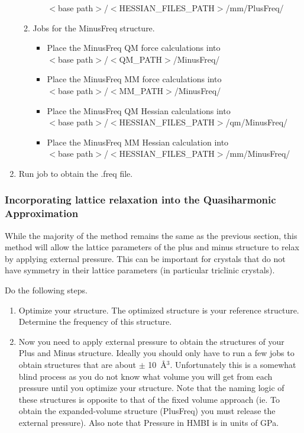 \documentclass[11pt,letterpaper]{article}
\begin{document}
\begin{spacing}{1.0}
\begin{enumerate}
\begin{enumerate}
\begin{itemize}
            $<$base path$>$/$<$HESSIAN\_FILES\_PATH$>$/mm/PlusFreq/  
        \end{itemize}
      \item Jobs for the MinusFreq structure.
        \begin{itemize}
          \item Place the MinusFreq QM force calculations into \\
            $<$base path$>$/$<$QM\_PATH$>$/MinusFreq/ 
          \item Place the MinusFreq MM force calculations into \\
            $<$base path$>$/$<$MM\_PATH$>$/MinusFreq/   
          \item Place the MinusFreq QM Hessian calculations into \\
            $<$base path$>$/$<$HESSIAN\_FILES\_PATH$>$/qm/MinusFreq/  
          \item Place the MinusFreq MM Hessian calculation into \\
            $<$base path$>$/$<$HESSIAN\_FILES\_PATH$>$/mm/MinusFreq/  
        \end{itemize}
      \end{enumerate}
    \item Run job to obtain the .freq file.

\end{enumerate}

\subsubsection{Incorporating lattice relaxation into the Quasiharmonic Approximation}
\label{Sec-Grun-freq-latt-relax}
While the majority of the method remains the same as the previous section, this method will allow the lattice parameters of the plus and minus structure to relax by applying external pressure. This can be important for crystals that do not have symmetry in their lattice parameters (in particular triclinic crystals).

Do the following steps.

\begin{enumerate}

  \item Optimize your structure. The optimized structure is your reference structure. Determine the frequency of this structure.
  \item Now you need to apply external pressure to obtain the structures of your Plus and Minus structure. Ideally you should only have to run a few jobs to obtain structures that are about $\pm$ 10~\AA$^3$. Unfortunately this is a somewhat blind process as you do not know what volume you will get from each pressure until you optimize your structure. Note that the naming logic of these structures is opposite to that of the fixed volume approach (ie. To obtain the expanded-volume structure (PlusFreq) you must release the external pressure). Also note that Pressure in HMBI is in units of GPa.



\end{enumerate}
\end{spacing}
\end{document}
